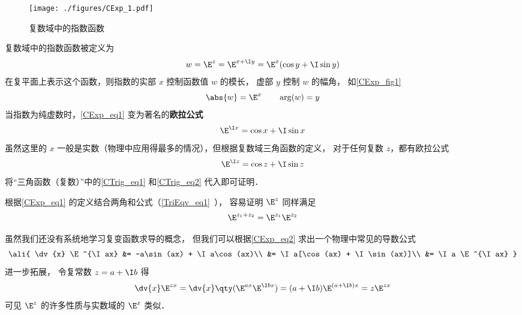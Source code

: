 


\begin{figure}[ht]
\centering
\texttt{[image: ./figures/CExp\_1.pdf]}
\caption{复数域中的指数函数} \label{CExp_fig1}
\end{figure}

复数域中的指数函数被定义为
 \begin{equation}\label{CExp_eq1}
w = \E^z = \E^{x + \I y} = \E^x(\cos y + \I\sin y)
\end{equation}
在复平面上表示这个函数，则指数的实部 $x$ 控制函数值 $w$ 的模长， 虚部 $y$ 控制 $w$ 的幅角， 如\autoref{CExp_fig1}
 \begin{equation}
\abs{w} = \E^x \qquad \arg(w) = y
\end{equation}
当指数为纯虚数时，\autoref{CExp_eq1} 变为著名的\textbf{欧拉公式}
\begin{equation}\label{CExp_eq2}
\E^{\I x} = \cos x + \I\sin x
\end{equation}
虽然这里的 $x$ 一般是实数（物理中应用得最多的情况），但根据复数域三角函数的定义， 对于任何复数 $z$，都有欧拉公式
\begin{equation}
\E^{\I z} = \cos z + \I\sin z
\end{equation}
将“三角函数（复数）”中的\autoref{CTrig_eq1} 和\autoref{CTrig_eq2} 代入即可证明．

根据\autoref{CExp_eq1} 的定义结合两角和公式（\autoref{TriEqv_eq1}~）， 容易证明 $\E^z$ 同样满足
\begin{equation}
\E^{z_1 + z_2} = \E^{z_1}\E^{z_2}
\end{equation}

虽然我们还没有系统地学习复变函数求导的概念， 但我们可以根据\autoref{CExp_eq2} 求出一个物理中常见的导数公式
\begin{equation}\ali{
\dv{x} \E^{\I ax} &= -a\sin(ax) + \I a\cos(ax)\\
&= \I a[\cos(ax) + \I \sin(ax)]\\
&= \I a \E^{\I ax}
}\end{equation}
进一步拓展， 令复常数 $z = a + \I b$ 得
\begin{equation}
\dv{x}\E^{z x} = \dv{x} \qty(\E^{ax}\E^{\I bx}) = (a + \I b)\E^{(a+\I b)x} = z\E^{zx}
\end{equation}
可见 $\E^z$ 的许多性质与实数域的 $\E^x$ 类似．


